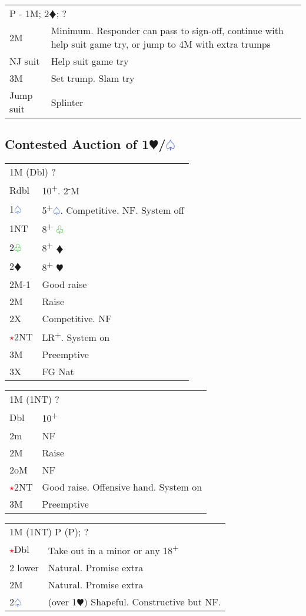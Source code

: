 \documentclass{article}
\renewcommand{\sp}{\textcolor{RoyalBlue}{$\varspade$}}
\newcommand{\he}{\textcolor{RubineRed}{$\varheart$}}
\newcommand{\di}{\textcolor{Peach}{$\vardiamond$}}
\newcommand{\cl}{\textcolor{LimeGreen}{$\varclub$}}
\newcommand{\nt}{\relsize{-1}NT\relsize{1}}
\newcommand{\up}{\textsuperscript{+}}
\newcommand{\down}{\textsuperscript{-}}
\newcommand{\al}{\textcolor{red}{$\star$}}
\begin{document}
\medskip

\begin{tabular}{|l|p{6.5cm}}
	\multicolumn{2}{l}{P - 1M; 2\di{}; ?}\\
	2M & Minimum. Responder can pass to sign-off, continue with help suit game try, or jump to 4M with extra trumps \\
	NJ suit & Help suit game try \\
	3M & Set trump. Slam try \\
	Jump suit & Splinter \\
\end{tabular}

\subsection{Contested Auction of 1\he/\sp{}}

\begin{tabular}{|l|p{6.5cm}}
	\multicolumn{2}{l}{1M (Dbl) ?} \\
	Rdbl & 10\up. 2\down{}M \\
	1\sp{} & 5\up{}\sp{}. Competitive. NF. System off \\
	1\nt{} & 8\up{} \cl{} \\
	2\cl{} & 8\up{} \di{} \\
	2\di{} & 8\up{} \he{} \\
	2M-1 & Good raise \\
	2M & Raise \\
	2X & Competitive. NF \\
	\al{}2\nt & LR\up{}. System on \\
	3M & Preemptive \\
	3X & FG Nat \\
\end{tabular}

\medskip

\begin{tabular}{|l|p{6.5cm}}
	\multicolumn{2}{l}{1M (1\nt{}) ?} \\
	Dbl & 10\up \\
	2m & NF \\
	2M & Raise \\
	2oM & NF \\
	\al{}2\nt & Good raise. Offensive hand. System on \\
	3M & Preemptive \\
\end{tabular}

\medskip

\begin{tabular}{|l|p{6.5cm}}
	\multicolumn{2}{l}{1M (1\nt{}) P (P); ?} \\
	\al{}Dbl & Take out in a minor or any 18\up{} \\
	2 lower & Natural. Promise extra \\
	2M & Natural. Promise extra \\
	2\sp{} & (over 1\he{}) Shapeful. Constructive but NF.
\end{tabular}
\end{document}
